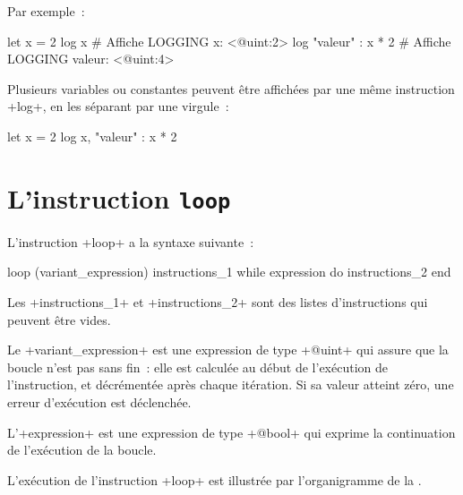 Par exemple~:
\begin{galgas}
let x = 2
log x # Affiche LOGGING x: <@uint:2>
log "valeur" : x * 2 # Affiche LOGGING valeur: <@uint:4>
\end{galgas}

Plusieurs variables ou constantes peuvent être affichées par une même instruction \ggs+log+, en les séparant par une virgule~:
\begin{galgas}
let x = 2
log x, "valeur" : x * 2
\end{galgas}














\section{L'instruction \texttt{loop}}


L'instruction \ggs+loop+ a la syntaxe suivante~:
\begin{galgasbox}
loop (variant_expression)
  instructions_1
while expression do
  instructions_2
end
\end{galgasbox}


Les \ggs+instructions_1+ et \ggs+instructions_2+ sont des listes d'instructions qui peuvent être vides.


Le \ggs+variant_expression+ est une expression de type \ggs+@uint+ qui assure que la boucle n'est pas sans fin~: elle est calculée au début de l'exécution de l'instruction, et décrémentée après chaque itération. Si sa valeur atteint zéro, une erreur d'exécution est déclenchée.

L'\ggs+expression+ est une expression de type \ggs+@bool+ qui exprime la continuation de l'exécution de la boucle.

L'exécution de l'instruction \ggs+loop+ est illustrée par l'organigramme de la .


